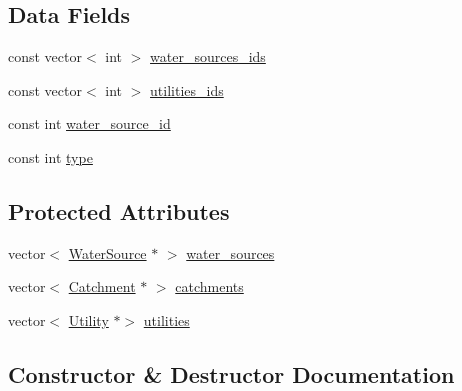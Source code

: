 \subsection*{Data Fields}
\begin{DoxyCompactItemize}
\item 
const vector$<$ int $>$ \mbox{\hyperlink{classMinEnvFlowControl_a775d6408e5c581754ee4240eea68abdc_a775d6408e5c581754ee4240eea68abdc}{water\+\_\+sources\+\_\+ids}}
\item 
const vector$<$ int $>$ \mbox{\hyperlink{classMinEnvFlowControl_a5c67ab20c181a1d22e4bf94e398451fc_a5c67ab20c181a1d22e4bf94e398451fc}{utilities\+\_\+ids}}
\item 
const int \mbox{\hyperlink{classMinEnvFlowControl_aada518a047598f386daec1d0358023aa_aada518a047598f386daec1d0358023aa}{water\+\_\+source\+\_\+id}}
\item 
const int \mbox{\hyperlink{classMinEnvFlowControl_abc3f168cd1ec36ba59e4b8604dfae8ec_abc3f168cd1ec36ba59e4b8604dfae8ec}{type}}
\end{DoxyCompactItemize}
\subsection*{Protected Attributes}
\begin{DoxyCompactItemize}
\item 
vector$<$ \mbox{\hyperlink{classWaterSource}{Water\+Source}} $\ast$ $>$ \mbox{\hyperlink{classMinEnvFlowControl_a36b50d0e6887b956051ae53bf5d2e3a9_a36b50d0e6887b956051ae53bf5d2e3a9}{water\+\_\+sources}}
\item 
vector$<$ \mbox{\hyperlink{classCatchment}{Catchment}} $\ast$ $>$ \mbox{\hyperlink{classMinEnvFlowControl_a99502573f30daf84d9ad7a2f62197b77_a99502573f30daf84d9ad7a2f62197b77}{catchments}}
\item 
vector$<$ \mbox{\hyperlink{classUtility}{Utility}} $\ast$$>$ \mbox{\hyperlink{classMinEnvFlowControl_a1a0a309138b35e8199c205efb5fb5f80_a1a0a309138b35e8199c205efb5fb5f80}{utilities}}
\end{DoxyCompactItemize}


\subsection{Constructor \& Destructor Documentation}
\mbox{\label{classMinEnvFlowControl_a093b292294d85f426c38deb6b7537d81_a093b292294d85f426c38deb6b7537d81}} 
